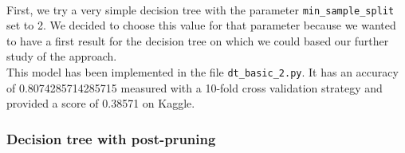 \documentclass[a4paper, 11pt, oneside]{article}
\begin{document}
\paragraph{}First, we try a very simple decision tree with the parameter \texttt{min\_sample\_split} set to 2. We decided to choose this value for that parameter because we wanted to have a first result for the decision tree on which we could based our further study of the approach.\\
This model has been implemented in the file \texttt{dt\_basic\_2.py}. It has an accuracy of 0.8074285714285715 measured with a 10-fold cross validation strategy and provided a score of 0.38571 on Kaggle.

\subsubsection{Decision tree with post-pruning} \label{subsubsec:dtPruning}
\end{document}
